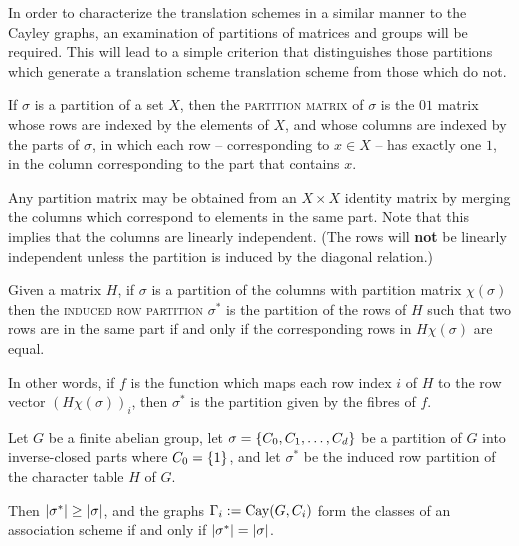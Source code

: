 \documentclass{report}
\begin{document}
    In order to characterize the translation schemes in a similar manner to the
    Cayley graphs, an examination of partitions of matrices and groups will be
    required.  This will lead to a simple criterion that distinguishes those
    partitions which generate a translation scheme translation scheme from those
    which do not.  \cite[Section~12.10]{godsil}

    \begin{defn}\label{partition-matrix}
      If $\sigma$ is a partition of a set $X$,
      then the \textsc{partition matrix} of $\sigma$
      is the $01$ matrix
      whose rows are indexed by the elements of $X$,
      and whose columns are indexed by the parts of $\sigma$,
      in which each row -- corresponding to $x \in X$ -- has exactly one $1$,
      in the column corresponding to the part that contains $x$.
    \end{defn}

    Any partition matrix may be obtained from an $X \times X$ identity matrix by
    merging the columns which correspond to elements in the same part.
    Note that this implies that the columns are linearly independent.
    (The rows will \textbf{not} be linearly independent unless the partition
    is induced by the diagonal relation.)

    \begin{defn}\label{induced-row-partition}
      Given a matrix $H$, if $\sigma$ is a partition of the columns with
      partition matrix $\chi(\sigma)$ then the \textsc{induced row partition}
      $\sigma^*$ is the partition of the rows of $H$ such that two rows are in the
      same part if and only if the corresponding rows in $H\chi(\sigma)$ are
      equal.  
    \end{defn}

    In other words, if $f$ is the function which maps each row index
    $i$ of $H$ to the row vector $(H\chi(\sigma))_i$, then $\sigma^*$ is the
    partition given by the fibres of $f$.
    \cite[Section 12.7]{godsil}

    \begin{thm}
      \label{translation-char}
      Let $G$ be a finite abelian group,
      let $\sigma = \left\lbrace C_0, C_1, \ldots, C_d \right\rbrace$ be a partition of $G$
      into inverse-closed parts where $C_0 = \left\lbrace 1 \right\rbrace$, and
      let $\sigma^*$ be the induced row partition
      of the character table $H$ of $G$.

      Then $\left\lvert \sigma^* \right\rvert \geq \left\lvert \sigma \right\rvert$,
      and the graphs $\Gamma_i := \operatorname{Cay}(G, C_i)$ form the classes of an
      association scheme if and only if $\left\lvert \sigma^* \right\rvert = \left\lvert \sigma \right\rvert$.
    \end{thm}
\end{document}
